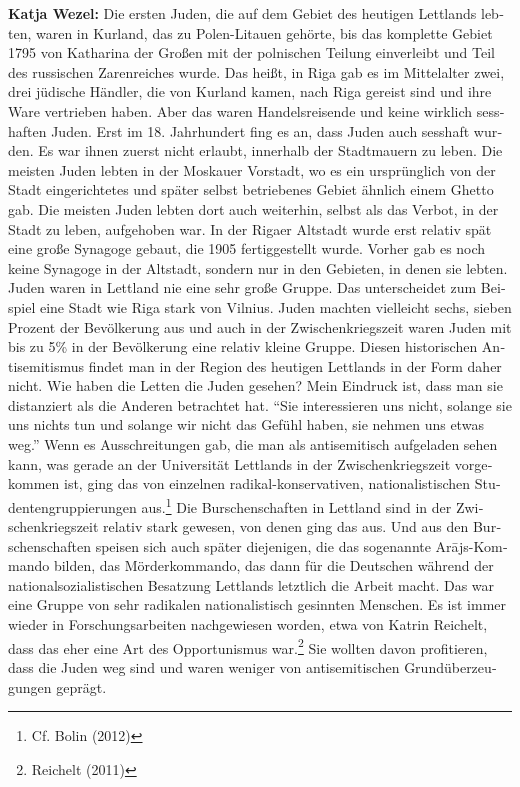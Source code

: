 \begin{otherlanguage}{ngerman}
\textbf{Katja Wezel:} Die ersten Juden, die auf dem Gebiet des heutigen Lettlands lebten, waren in Kurland, das zu Polen-Litauen gehörte, bis das komplette Gebiet 1795 von Katharina der Großen mit der polnischen Teilung einverleibt und Teil des russischen Zarenreiches wurde. Das heißt, in Riga gab es im Mittelalter zwei, drei jüdische Händler, die von Kurland kamen, nach Riga gereist sind und ihre Ware vertrieben haben. Aber das waren Handelsreisende und keine wirklich sesshaften Juden. Erst im 18. Jahrhundert fing es an, dass Juden auch sesshaft wurden. Es war ihnen zuerst nicht erlaubt, innerhalb der Stadtmauern zu leben. Die meisten Juden lebten in der Moskauer Vorstadt, wo es ein ursprünglich von der Stadt eingerichtetes und später selbst betriebenes Gebiet ähnlich einem Ghetto gab. Die meisten Juden lebten dort auch weiterhin, selbst als das Verbot, in der Stadt zu leben, aufgehoben war. In der Rigaer Altstadt wurde erst relativ spät eine große Synagoge gebaut, die 1905 fertiggestellt wurde. Vorher gab es noch keine Synagoge in der Altstadt, sondern nur in den Gebieten, in denen sie lebten. 
Juden waren in Lettland nie eine sehr große Gruppe. Das unterscheidet zum Beispiel eine Stadt wie Riga stark von Vilnius. Juden machten vielleicht sechs, sieben Prozent der Bevölkerung aus und auch in der Zwischenkriegszeit waren Juden mit bis zu 5\% in der Bevölkerung eine relativ kleine Gruppe. Diesen historischen Antisemitismus findet man in der Region des heutigen Lettlands in der Form daher nicht. 
Wie haben die Letten die Juden gesehen? Mein Eindruck ist, dass man sie distanziert als die Anderen betrachtet hat. "`Sie interessieren uns nicht, solange sie uns nichts tun und solange wir nicht das Gefühl haben, sie nehmen uns etwas weg."' Wenn es Ausschreitungen gab, die man als antisemitisch aufgeladen sehen kann, was gerade an der Universität Lettlands in der Zwischenkriegszeit vorgekommen ist, ging das von einzelnen radikal-konservativen, nationalistischen Studentengruppierungen aus.\footnote{Cf. Bolin (2012)} Die Burschenschaften in Lettland sind in der Zwischenkriegszeit relativ stark gewesen, von denen ging das aus. Und aus den Burschenschaften speisen sich auch später diejenigen, die das sogenannte Arājs-Kommando bilden, das Mörderkommando, das dann für die Deutschen während der nationalsozialistischen Besatzung Lettlands letztlich die Arbeit macht. Das war eine Gruppe von sehr radikalen nationalistisch gesinnten Menschen. Es ist immer wieder in Forschungsarbeiten nachgewiesen worden, etwa von Katrin Reichelt, dass das eher eine Art des Opportunismus war.\footnote{Reichelt (2011)} Sie wollten davon profitieren, dass die Juden weg sind und waren weniger von antisemitischen Grundüberzeugungen geprägt. 


\end{otherlanguage}

